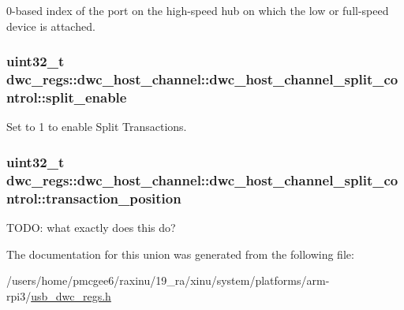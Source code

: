 0-\/based index of the port on the high-\/speed hub on which the low or full-\/speed device is attached. \hypertarget{uniondwc__regs_1_1dwc__host__channel_1_1dwc__host__channel__split__control_abd68a1a007fca3d1d5c31453c61eb215}{
\subsubsection[{split\-\_\-enable}]{\setlength{\rightskip}{0pt plus 5cm}uint32\-\_\-t dwc\-\_\-regs\-::dwc\-\_\-host\-\_\-channel\-::dwc\-\_\-host\-\_\-channel\-\_\-split\-\_\-control\-::split\-\_\-enable}}\label{uniondwc__regs_1_1dwc__host__channel_1_1dwc__host__channel__split__control_abd68a1a007fca3d1d5c31453c61eb215}
Set to 1 to enable Split Transactions. \hypertarget{uniondwc__regs_1_1dwc__host__channel_1_1dwc__host__channel__split__control_a1067c69c6c58d4968fb5b32cbdecff6c}{
\subsubsection[{transaction\-\_\-position}]{\setlength{\rightskip}{0pt plus 5cm}uint32\-\_\-t dwc\-\_\-regs\-::dwc\-\_\-host\-\_\-channel\-::dwc\-\_\-host\-\_\-channel\-\_\-split\-\_\-control\-::transaction\-\_\-position}}\label{uniondwc__regs_1_1dwc__host__channel_1_1dwc__host__channel__split__control_a1067c69c6c58d4968fb5b32cbdecff6c}
T\-O\-D\-O\-: what exactly does this do? 

The documentation for this union was generated from the following file\-:\begin{DoxyCompactItemize}
\item 
/users/home/pmcgee6/raxinu/19\-\_\-ra/xinu/system/platforms/arm-\/rpi3/\hyperlink{usb__dwc__regs_8h}{usb\-\_\-dwc\-\_\-regs.\-h}\end{DoxyCompactItemize}
